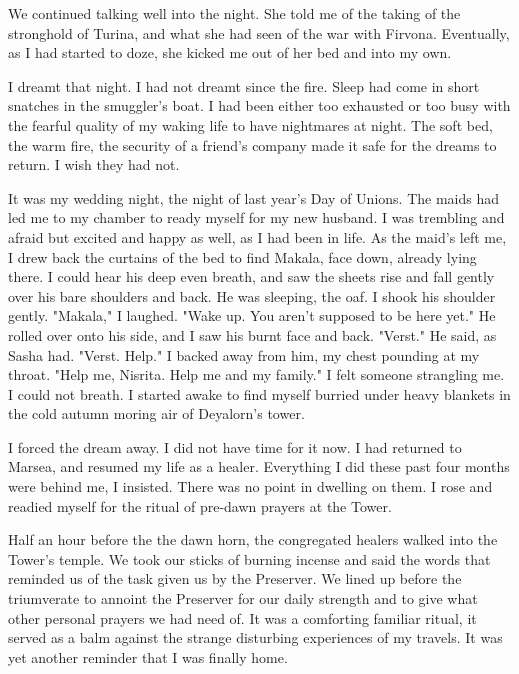 \documentclass{article}
\begin{document}
We continued talking well into the night. She told me of the taking of the stronghold of Turina, and what she had seen of the war with Firvona. Eventually, as I had started to doze, she kicked me out of her bed and into my own.

\vspace{.5cm}

I dreamt that night. I had not dreamt since the fire. Sleep had come in short snatches in the smuggler's boat. I had been either too exhausted or too busy with the fearful quality of my waking life to have nightmares at night. The soft bed, the warm fire, the security of a friend's company made it safe for the dreams to return. I wish they had not. 

It was my wedding night, the night of last year's Day of Unions. The maids had led me to my chamber to ready myself for my new husband. I was trembling and afraid but excited and happy as well, as I had been in life. As the maid's left me, I drew back the curtains of the bed to find Makala, face down, already lying there. I could hear his deep even breath, and saw the sheets rise and fall gently over his bare shoulders and back. He was sleeping, the oaf. I shook his shoulder gently. "Makala," I laughed. "Wake up. You aren't supposed to be here yet." He rolled over onto his side, and I saw his burnt face and back. "Verst." He said, as Sasha had. "Verst. Help." I backed away from him, my chest pounding at my throat. "Help me, Nisrita. Help me and my family." I felt someone strangling me. I could not breath. I started awake to find myself burried under heavy blankets in the cold autumn moring air of Deyalorn's tower. 

I forced the dream away. I did not have time for it now. I had returned to Marsea, and resumed my life as a healer. Everything I did these past four months were behind me, I insisted. There was no point in dwelling on them. I rose and readied myself for the ritual of pre-dawn prayers at the Tower. \begin{comment} How many days of my life could I force myself not to think of, I wondered as I wound down the stairs to the entrance hall where people would gather. If I refused to remember the fire, could I make that memory go away? I had not succeeded in chasing memores of that other day from my dreams, even if I refused to think about it while awake.  \end{comment}

Half an hour before the the dawn horn, the congregated healers walked into the Tower's temple. We took our sticks of burning incense and said the words that reminded us of the task given us by the Preserver. We lined up before the triumverate to annoint the Preserver for our daily strength and to give what other personal prayers we had need of. It was a comforting familiar ritual, it served as a balm against the strange disturbing experiences of my travels. It was yet another reminder that I was finally home.
\end{document}
